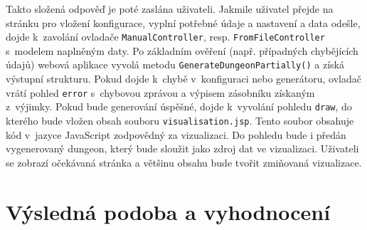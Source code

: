 Takto složená odpověď je poté zaslána uživateli.
Jakmile uživatel přejde na stránku pro vložení konfigurace, vyplní potřebné údaje a nastavení a data odešle, dojde k~zavolání ovladače \texttt{ManualController}, resp. \texttt{FromFileController} s~modelem naplněným daty.
Po základním ověření (např. případných chybějících údajů) webová aplikace vyvolá metodu \texttt{GenerateDungeonPartially()} a získá výstupní strukturu.
Pokud dojde k~chybě v~konfiguraci nebo generátoru, ovladač vrátí pohled \texttt{error} s~chybovou zprávou a výpisem zásobníku získaným z~výjimky.
Pokud bude generování úspěšné, dojde k~vyvolání pohledu \texttt{draw}, do kterého bude vložen obsah souboru \texttt{visualisation.jsp}.
Tento soubor obsahuje kód v~jazyce JavaScript zodpovědný za vizualizaci.
Do pohledu bude i předán vygenerovaný dungeon, který bude sloužit jako zdroj dat ve vizualizaci.
Uživateli se zobrazí očekávaná stránka a většinu obsahu bude tvořit zmiňovaná vizualizace.


\section{Výsledná podoba a vyhodnocení}


